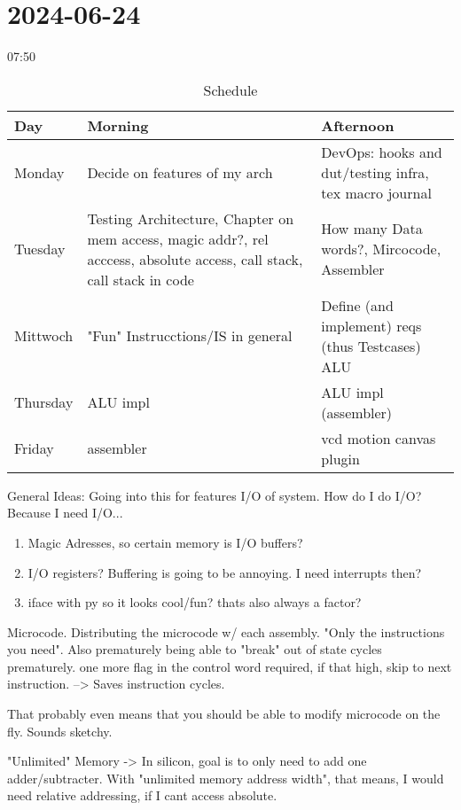 \section{2024-06-24} %
\label{subsec:2024-06-24}
07:50
\begin{table}
  \caption{Schedule}\label{tab:}
  \begin{center}
    \begin{tabular}[c]{l|l|l}
      \hline
      Day & Morning & Afternoon \\
      \hline
      Monday & Decide on features of my arch & DevOps: hooks and dut/testing infra, tex macro journal \\
      Tuesday & Testing Architecture, Chapter on mem access, magic addr?, rel acccess, absolute access, call stack, call stack in code & How many Data words?, Mircocode, Assembler \\
      Mittwoch & "Fun" Instrucctions/IS in general & Define (and implement) reqs (thus Testcases) ALU \\
      Thursday & ALU impl & ALU impl (assembler) \\
      Friday & assembler & vcd motion canvas plugin \\
      
      \hline
    \end{tabular}
  \end{center}
\end{table}

General Ideas: Going into this for features
I/O of system. How do I do I/O? Because I need I/O...
\begin{enumerate}
  \item Magic Adresses, so certain memory is I/O buffers?
  \item I/O registers? Buffering is going to be annoying. I need interrupts then?
  \item iface with py so it looks cool/fun? thats also always a factor? 
\end{enumerate}

Microcode. 
Distributing the microcode w/ each assembly. 
"Only the instructions you need". 
Also prematurely being able to "break" out of state cycles prematurely. one more flag in the control word required, if that high, skip to next instruction. 
--> Saves instruction cycles. 

That probably even means that you should be able to modify microcode on the fly. Sounds sketchy. 


"Unlimited" Memory -> In silicon, goal is to only need to add one adder/subtracter. 
With "unlimited memory address width", that means, I would need relative addressing, if I cant access absolute. 

